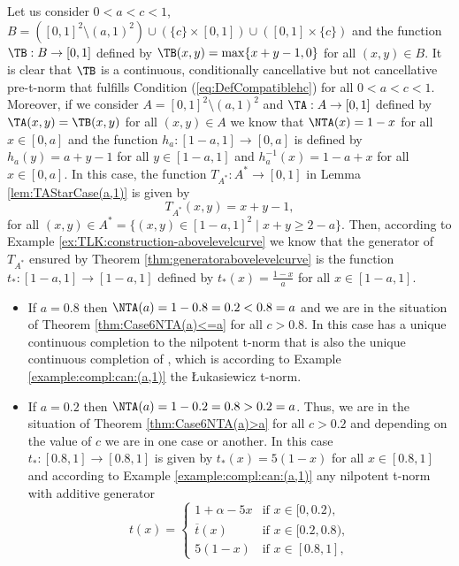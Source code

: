 \begin{example}\label{ex:Example[0,a]c}
	Let us consider $0<a<c<1$, $B=([0,1]^2 \setminus (a,1)^2) \cup (\{c\} \times [0,1]) \cup ([0,1] \times \{c\})$ and the function $\TB:B \to [0,1]$ defined by $\TB(x,y)=\max \{x+y-1,0\}$ for all $(x,y) \in B$. It is clear that $\TB$ is a continuous, conditionally cancellative but not cancellative pre-t-norm that fulfills Condition (\ref{eq:DefCompatiblehc}) for all $0<a<c<1$. Moreover, if we consider $A=[0,1]^2 \setminus (a,1)^2$ and $\TA:A \to [0,1]$ defined by $\TA(x,y)=\TB(x,y)$ for all $(x,y) \in A$ we know that $\NTA(x)=1-x$ for all $x \in [0,a]$ and the function $h_a:[1-a,1] \to [0,a]$ is defined by $h_a(y)=a+y-1$ for all $y \in [1-a,1]$ and $h_a^{-1}(x)=1-a+x$ for all $x \in [0,a]$. In this case, the function $T_{A^*} : A^* \to [0,1]$ in Lemma \ref{lem:TAStarCase(a,1)} is given by
	$$T_{A^*}(x,y)=x+y-1, $$
	for all $(x,y) \in A^*=\{(x,y) \in [1-a,1]^2  \mid x+y \geq 2-a\}$. Then, according to Example \ref{ex:TLK:construction-abovelevelcurve} we know that the generator of $T_{A^*}$ ensured by Theorem \ref{thm:generatorabovelevelcurve} is the function $t_*:[1-a,1] \to [1-a,1]$ defined by $t_*(x)=\frac{1-x}{a}$ for all $x \in [1-a,1]$.
	\begin{itemize}
		\item If $a=0.8$ then $\NTA(a)=1-0.8=0.2<0.8=a$ and we are in the situation of Theorem \ref{thm:Case6NTA(a)<=a} for all $c>0.8$. In this case \TB has a unique continuous completion to the nilpotent t-norm that is also the unique continuous completion of \TA, which is according to Example \ref{example:compl:can:(a,1)} the Łukasiewicz t-norm.
		\item If $a=0.2$ then $\NTA(a)=1-0.2=0.8>0.2=a$. Thus, we are in the situation of Theorem \ref{thm:Case6NTA(a)>a} for all $c>0.2$ and depending on the value of $c$ we are in one case or another. In this case  $t_*:[0.8,1] \to [0.8,1]$ is given by $t_*(x)=5(1-x)$ for all $x \in [0.8,1]$ and according to Example \ref{example:compl:can:(a,1)} any nilpotent t-norm with additive generator
		\begin{equation}\label{exempleTB:GenTAStar}
			t(x)
			=
			\left\{ \begin{array}{ll}
				1 + \alpha -5x & \text{if } x \in [0,0.2), \\
				\overline{t}(x) & \text{if } x \in [0.2,0.8),\\
				5 (1 - x) & \text{if } x \in [0.8,1],
			\end{array} \right.
		\end{equation}

\end{itemize}
\end{example}
